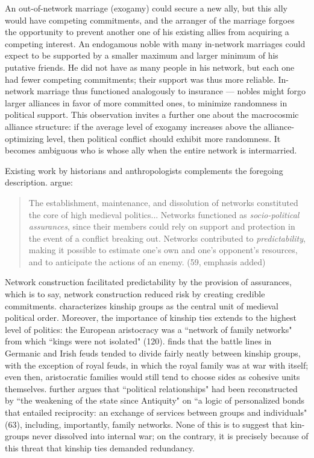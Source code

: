 \documentclass[12pt]{article}
\theoremstyle{definition}
\theoremstyle{remark}
\begin{document}
An out-of-network marriage (exogamy) could secure a new ally, but this ally would have competing commitments, and the arranger of the marriage forgoes the opportunity to prevent another one of his existing allies from acquiring a competing interest. An endogamous noble with many in-network marriages could expect to be supported by a smaller maximum and larger minimum of his putative friends. He did not have as many people in his network, but each one had fewer competing commitments; their support was thus more reliable. In-network marriage thus functioned analogously to insurance — nobles might forgo larger alliances in favor of more committed ones, to minimize randomness in political support. This observation invites a further one about the macrocosmic alliance structure: if the average level of exogamy increases above the alliance-optimizing level, then political conflict should exhibit more randomness. It becomes ambiguous who is whose ally when the entire network is intermarried.

Existing work by historians and anthropologists complements the foregoing description. \citet{hermanson_orning_2020} argue:

\begin{quote}
The establishment, maintenance, and dissolution of networks constituted the core of high medieval politics... Networks functioned as \textit{socio-political assurances}, since their members could rely on support and protection in the event of a conflict breaking out. Networks contributed to \textit{predictability}, making it possible to estimate one's own and one's opponent's resources, and to anticipate the actions of an enemy. (59, emphasis added)
\end{quote}

Network construction facilitated predictability by the provision of assurances, which is to say, network construction reduced risk by creating credible commitments. \citet{halden_2020} characterizes kinship groups as the central unit of medieval political order. Moreover, the importance of kinship ties extends to the highest level of politics: the European aristocracy was a ``network of family networks" from which ``kings were not isolated" (120). \citet{hornaday_1996} finds that the battle lines in Germanic and Irish feuds tended to divide fairly neatly between kinship groups, with the exception of royal feuds, in which the royal family was at war with itself; even then, aristocratic families would still tend to choose sides as cohesive units themselves. \citet{lejan_1998} further argues that ``political relationships" had been reconstructed by ``the weakening of the state since Antiquity" on ``a logic of personalized bonds that entailed reciprocity: an exchange of services between groups and individuals" (63), including, importantly, family networks. None of this is to suggest that kin-groups never dissolved into internal war; on the contrary, it is precisely because of this threat that kinship ties demanded redundancy.
\end{document}
